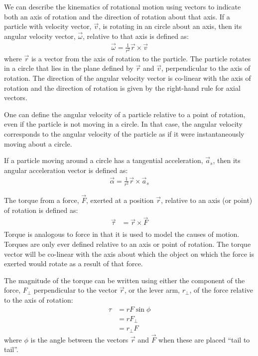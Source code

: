 We can describe the kinematics of rotational motion using vectors to indicate both an axis of rotation and the direction of rotation about that axis. If a particle with velocity vector, $\vec v$, is rotating in an circle about an axis, then its angular velocity vector, $\vec\omega$, relative to that axis is defined as:
\begin{align*}
\vec\omega = \frac{1}{r^2}\vec r \times \vec v
\end{align*}
where $\vec r$ is a vector from the axis of rotation to the particle. The particle rotates in a circle that lies in the plane defined by $\vec r$ and $\vec v$, perpendicular to the axis of rotation. The direction of the angular velocity vector is co-linear with the axis of rotation and the direction of rotation is given by the right-hand rule for axial vectors.

One can define the angular velocity of a particle relative to a point of rotation, even if the particle is not moving in a circle. In that case, the angular velocity corresponds to the angular velocity of the particle as if it were instantaneously moving about a circle.

If a particle moving around a circle has a tangential acceleration, $\vec a_s$, then its angular acceleration vector is defined as:
\begin{align*}
\vec\alpha = \frac{1}{r^2}\vec r \times \vec a_s
\end{align*}

The torque from a force, $\vec F$, exerted at a position $\vec r$, relative to an axis (or point) of rotation is defined as:
\begin{align*}
\vec\tau &= \vec r \times \vec F\\
\end{align*}
Torque is analogous to force in that it is used to model the causes of motion. Torques are only ever defined relative to an axis or point of rotation. The torque vector will be co-linear with the axis about which the object on which the force is exerted would rotate as a result of that force.

The magnitude of the torque can be written using either the component of the force, $F_\perp$ perpendicular to the vector $\vec r$, or the lever arm, $r_\perp$, of the force relative to the axis of rotation:
\begin{align*}
\tau &= rF\sin\phi\\
&=rF_\perp\\
&=r_\perp F
\end{align*}
where $\phi$ is the angle between the vectors $\vec r$ and $\vec F$ when these are placed ``tail to tail''.

